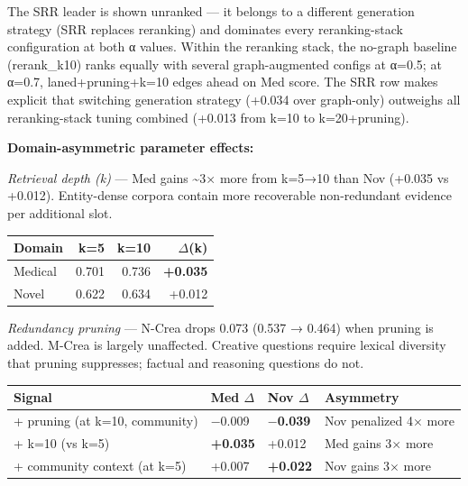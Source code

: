 The SRR leader is shown unranked --- it belongs to a different generation strategy (SRR replaces reranking) and dominates every reranking-stack configuration at both α values. Within the reranking stack, the no-graph baseline (rerank\_k10) ranks equally with several graph-augmented configs at α=0.5; at α=0.7, laned+pruning+k=10 edges ahead on Med score. The SRR row makes explicit that switching generation strategy (+0.034 over graph-only) outweighs all reranking-stack tuning combined (+0.013 from k=10 to k=20+pruning).

\textbf{Domain-asymmetric parameter effects:}

\emph{Retrieval depth (k)} --- Med gains \textasciitilde3× more from k=5→10 than Nov (+0.035 vs +0.012). Entity-dense corpora contain more recoverable non-redundant evidence per additional slot.

\begin{small}
\setlength{\tabcolsep}{4pt}
\begin{longtable}{p{1.2in}rrr}
\toprule
\textbf{Domain} & \textbf{k=5} & \textbf{k=10} & \textbf{$\Delta$(k)} \\
\midrule
\endhead
Medical & 0.701 & 0.736 & \textbf{+0.035} \\
Novel & 0.622 & 0.634 & +0.012 \\
\bottomrule
\end{longtable}
\end{small}

\emph{Redundancy pruning} --- N-Crea drops 0.073 (0.537 → 0.464) when pruning is added. M-Crea is largely unaffected. Creative questions require lexical diversity that pruning suppresses; factual and reasoning questions do not.

\begin{small}
\setlength{\tabcolsep}{4pt}
\begin{longtable}{p{2.2in}p{0.8in}p{0.8in}p{2.0in}}
\toprule
\textbf{Signal} & \textbf{Med $\Delta$} & \textbf{Nov $\Delta$} & \textbf{Asymmetry} \\
\midrule
\endhead
+ pruning (at k=10, community) & $-$0.009 & \textbf{$-$0.039} & Nov penalized 4$\times$ more \\
+ k=10 (vs k=5) & \textbf{+0.035} & +0.012 & Med gains 3$\times$ more \\
+ community context (at k=5) & +0.007 & \textbf{+0.022} & Nov gains 3$\times$ more \\
\bottomrule
\end{longtable}
\end{small}

